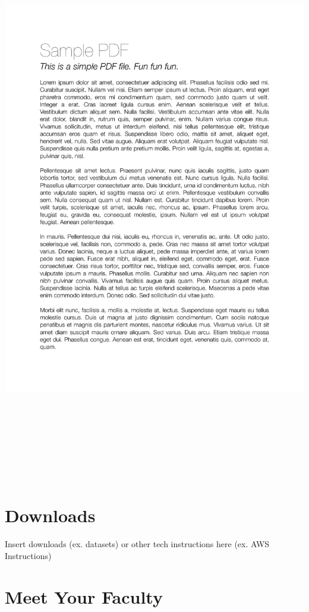 \documentclass[
]{book}
\begin{document}
\includegraphics[width=1\textwidth,height=9.375in]{content-files/sample-pdf.pdf}~

\section{Downloads}\label{downloads}

Insert downloads (ex. datasets) or other tech instructions here (ex. AWS Instructions)

\section{Meet Your Faculty}\label{meet-your-faculty}
\end{document}
